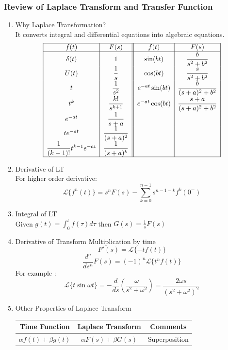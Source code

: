 \documentclass{article}
\begin{document}
\subsubsection{Review of Laplace Transform and Transfer Function}
\begin{enumerate}
\item  Why Laplace Transformation? \\
It converts integral and differential equations into algebraic equations.\\
\[
\begin{array}{|c|c||c|c|}
\hline
f(t) & F(s) & f(t) & F(s) \\
\hline
\delta(t) & 1 & \sin(bt) & \dfrac{b}{s^2+b^2} \\
U(t) & \dfrac{1}{s} & \cos(bt) & \dfrac{s}{s^2+b^2} \\
t & \dfrac{1}{s^2} & e^{-at} \sin(bt) & \dfrac{b}{(s+a)^2+b^2} \\
t^k & \dfrac{k!}{s^{k+1}} & e^{-at} \cos(bt) & \dfrac{s+a}{(s+a)^2+b^2} \\
e^{-at} & \dfrac{1}{s+a} & & \\
te^{-at} & \dfrac{1}{(s+a)^2} & & \\
\dfrac{1}{(k-1)!}t^{k-1}e^{-at} & \dfrac{1}{(s+a)^k} & & \\
\hline
\end{array}
\]
\item Derivative of LT \\
For higher order derivative: 
\[\displaystyle \mathscr{L}\{f^n(t)\} = s^n F(s) - \sum_{k=0}^{n-1} s^{n-1-k} f^k(0^-)\]
\item Integral of LT \\
Given $\displaystyle g(t) = \int_0^t f(\tau)d\tau$ then $\displaystyle G(s) = \frac{1}{s}F(s)$
\item Derivative of Transform Multiplication by time
\[F'(s) = \mathcal{L}\{-tf(t)\}\]
\[\frac{d^n}{ds^n}F(s) = (-1)^n \mathcal{L}\{t^n f(t)\}\]
For example : 
\[\mathcal{L}\{t\sin\omega t\} = -\frac{d}{ds} \left( \frac{\omega}{s^2 + \omega^2} \right) = \frac{2\omega s}{(s^2 + \omega^2)^2}
\]
\newpage
\item Other Properties of Laplace Transform
    \begin{table}[h]
    \begin{center}
    \begin{tabular}{|c|c|c|}
    \hline
    \textbf{Time Function} & \textbf{Laplace Transform} & \textbf{Comments} \\ \hline
    $\alpha f(t) + \beta g(t)$ & $\alpha F(s) + \beta G(s)$ &  Superposition \\ \hline

\end{tabular}
\end{center}
\end{table}
\end{enumerate}
\end{document}
